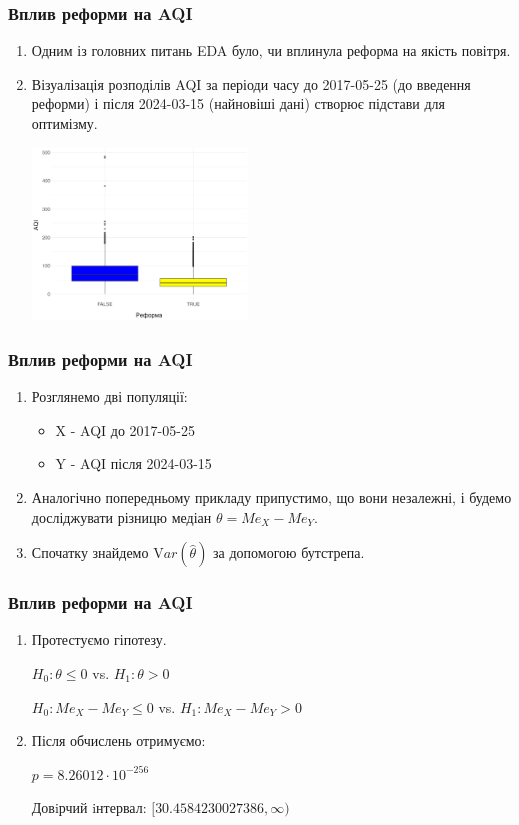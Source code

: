 \documentclass{beamer}
\begin{document}
\begin{frame}
  \frametitle{Вплив реформи на AQI}

  \begin{enumerate}
    \item Одним із головних питань EDA було, чи вплинула реформа на якість повітря. 
    \item Візуалізація розподілів AQI за періоди часу до 2017-05-25 (до введення реформи) і 
    після 2024-03-15 (найновіші дані) створює підстави для оптимізму.
  
    \begin{center}
      \includegraphics[height=1.8in]{./plots/lab2/hypotheses/reform_vs_aqi.png}
    \end{center}
  \end{enumerate}
\end{frame}

\begin{frame}
  \frametitle{Вплив реформи на AQI}

  \begin{enumerate}
    \item Розглянемо дві популяції:

    \begin{itemize}
      \item X - AQI до 2017-05-25
      \item Y - AQI після 2024-03-15
    \end{itemize}

    \item Аналогічно попередньому прикладу припустимо, що вони незалежні, 
    і будемо досліджувати різницю медіан $\theta = Me_X - Me_Y$.  
    
    \item Спочатку знайдемо $\mathrm Var(\hat{\theta})$ за допомогою бутстрепа.
  \end{enumerate}
\end{frame}

\begin{frame}
  \frametitle{Вплив реформи на AQI}

  \begin{enumerate}
    \item Протестуємо гіпотезу.  

    $H_0: \theta \le 0$ vs. $H_1: \theta > 0$  

    $H_0: Me_X - Me_Y \le 0$ vs. $H_1: Me_X - Me_Y > 0$
    
    \item Після обчислень отримуємо:
    
    $p = 8.26012 \cdot 10^{-256}$

    Довiрчий iнтервал: $ [30.4584230027386, \infty) $
  \end{enumerate}
\end{frame}
\end{document}
